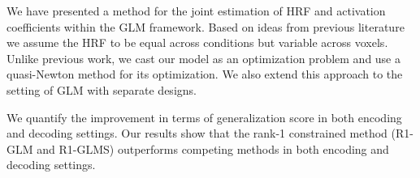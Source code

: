 We have presented a method for the joint estimation of HRF and
activation coefficients within the GLM framework. Based on ideas from previous
literature~\citep{Makni2008,vincent2010spatially} we assume the HRF to be equal
across conditions but variable across voxels. Unlike previous work, we cast
our model as an optimization problem and use a quasi-Newton method for its optimization. We also extend this approach to the setting of GLM
with separate designs.

We quantify the improvement in terms of generalization score in both encoding
and decoding settings. Our results show that the rank-1 constrained method
(R1-GLM and R1-GLMS) outperforms competing methods in both encoding and
decoding settings. 

\newpage

\begin{fullwidth}


\end{fullwidth}
